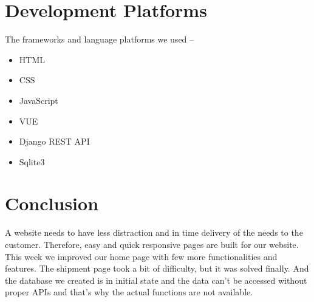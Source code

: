 \documentclass[a4paper,12pt]{report}
\begin{document}
\section*{Development Platforms}
The frameworks and language platforms we used --
\begin{itemize}
	\item HTML
	\item CSS
\item JavaScript
	\item VUE
\item Django REST API
\item Sqlite3
\end{itemize}

\section*{Conclusion}
A website needs to have less distraction and in time delivery of the needs to the customer. Therefore, easy and quick responsive pages are built for our website.
This week we improved our home page with few more functionalities and features. The shipment page took a bit of difficulty, but it was solved finally. And the database we created is in initial state and the data can't be accessed without proper APIs and that's why the actual functions are not available.
\end{document}
